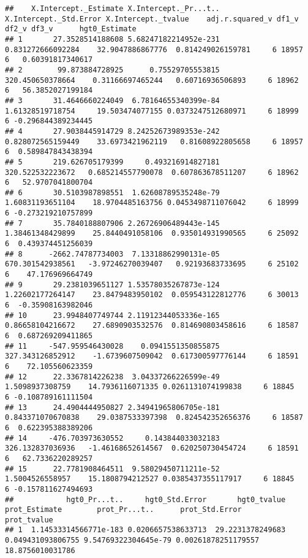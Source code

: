 \documentclass[
]{book}
\begin{document}
\begin{verbatim}
##    X.Intercept._Estimate X.Intercept._Pr...t.. X.Intercept._Std.Error X.Intercept._tvalue    adj.r.squared_v df1_v df2_v df3_v      hgt0_Estimate
## 1       27.3528514188608 5.68247182214952e-231      0.831272666092284    32.9047886867776  0.814249026159781     6 18957     6   0.60391817340617
## 2        99.873884728925      0.75529705553815       320.450650378664    0.31166697465244   0.60716936506893     6 18962     6   56.3852027199184
## 3       31.4646660224049  6.78164655340399e-84       1.61328519718754     19.503474077155 0.0373247512680971     6 18999     6 -0.296844389234445
## 4       27.9038445914729 8.24252673989353e-242      0.828072565159449    33.6973421962119   0.81608922805658     6 18957     6  0.589847843438394
## 5       219.626705179399     0.493216914827181       320.522532223672   0.685214557790078  0.607863678511207     6 18962     6   52.9707041800704
## 6       30.5103987898551  1.62608789535248e-79       1.60831193651104    18.9704485163756 0.0453498711076042     6 18999     6 -0.273219210757899
## 7       35.7840188807906 2.26726906489443e-145       1.38461348429899    25.8440491058106  0.935014931990565     6 25092     6  0.439374451256039
## 8      -2662.74787734003  7.13318862990131e-05       670.301542938561   -3.97246270039407   0.92193683733695     6 25102     6    47.176969664749
## 9       29.2381039651127 1.53578035267873e-124       1.22602177264147    23.8479483950102  0.059543122812776     6 30013     6  -0.35908163982046
## 10      23.9948407749744 2.11912344053336e-165       0.86658104216672    27.6890903532576  0.814690803458616     6 18587     6  0.687269209411865
## 11     -547.959546430028    0.0941551350855875       327.343126852912    -1.6739607509042  0.617300597776144     6 18591     6    72.105560623359
## 12      22.3367814226238  3.04337266226599e-49        1.5098937308759    14.7936116071335 0.0261131074199838     6 18845     6 -0.108789161111504
## 13      24.4904444950827 2.34941965806705e-181      0.843371070670838    29.0387533397398  0.824542352656376     6 18587     6  0.622395388389206
## 14     -476.703973630552     0.143844033032183       326.132837036936   -1.46168652614567  0.620250730454724     6 18591     6   62.7336220289257
## 15      22.7781908464511  9.58029450711211e-52        1.5004526558957    15.1808794212527 0.0385437355117917     6 18845     6 -0.157811627494693
##            hgt0_Pr...t..     hgt0_Std.Error       hgt0_tvalue       prot_Estimate        prot_Pr...t..      prot_Std.Error       prot_tvalue
## 1  1.14533314566771e-183 0.0206657538633713  29.2231378249683   0.049431093806755 9.54769322304645e-79 0.00261878251179557  18.8756010031786

\end{verbatim}
\end{document}
